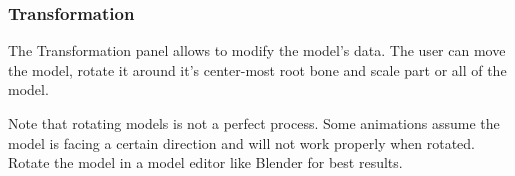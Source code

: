 \documentclass[10pt, a4paper, titlepage, oneside]{article}
\begin{document}
\subsubsection{Transformation}

The Transformation panel allows to modify the model's data. The user can move the model, rotate it around it's center-most root bone and scale part or all of the model.

\vspace{\baselineskip}
Note that rotating models is not a perfect process. Some animations assume the model is facing a certain direction and will not work properly when rotated. Rotate the model in a model editor like Blender for best results.

\setlength{\parindent}{15pt}
\end{document}
